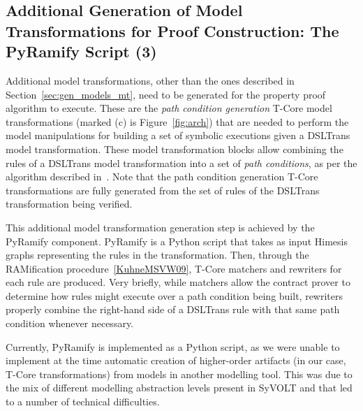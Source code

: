 


\subsection{Additional Generation of Model Transformations for Proof
Construction: The PyRamify Script (3)}

Additional model transformations, other than the ones described in
Section~\ref{sec:gen_models_mt}, need to be generated for the property proof
algorithm to execute. These are the \emph{path condition generation} T-Core
model transformations (marked (c) is Figure~\ref{fig:arch}) that are needed to
perform the model manipulations for building a set of symbolic executions given a DSLTrans
model transformation. These model transformation blocks allow combining the rules of a DSLTrans model
transformation into a set of \emph{path conditions}, as per the algorithm
described in~\cite{Lucio2014}. Note that the path condition generation T-Core
transformations are fully generated from the set of rules of the DSLTrans
transformation being verified.

This additional model transformation generation step is achieved by the PyRamify
component. PyRamify is a Python script that takes as input Himesis graphs
representing the rules in the transformation. Then, through the RAMification
procedure~\ref{KuhneMSVW09}, T-Core matchers and rewriters for each rule are
produced. Very briefly, while matchers allow the contract prover to determine
how rules might execute over a path condition being built, rewriters properly
combine the right-hand side of a DSLTrans rule with that same path condition
whenever necessary.


Currently, PyRamify is implemented as a Python script, as we were unable to
implement at the time automatic creation of higher-order artifacts (in our
case, T-Core transformations) from models in another modelling tool.
This was due to the mix of different modelling abstraction levels present in
SyVOLT and that led to a number of technical difficulties.

